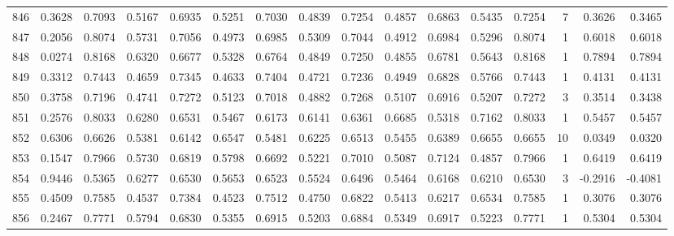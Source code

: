 \begin{tabular}{lrrrrrrrrrrrrrrr}
846 &      0.3628 &  0.7093 &  0.5167 &  0.6935 &  0.5251 &  0.7030 &  0.4839 &  0.7254 &  0.4857 &  0.6863 &   0.5435 &     0.7254 &      7 &                    0.3626 &                     0.3465 \\
847 &      0.2056 &  0.8074 &  0.5731 &  0.7056 &  0.4973 &  0.6985 &  0.5309 &  0.7044 &  0.4912 &  0.6984 &   0.5296 &     0.8074 &      1 &                    0.6018 &                     0.6018 \\
848 &      0.0274 &  0.8168 &  0.6320 &  0.6677 &  0.5328 &  0.6764 &  0.4849 &  0.7250 &  0.4855 &  0.6781 &   0.5643 &     0.8168 &      1 &                    0.7894 &                     0.7894 \\
849 &      0.3312 &  0.7443 &  0.4659 &  0.7345 &  0.4633 &  0.7404 &  0.4721 &  0.7236 &  0.4949 &  0.6828 &   0.5766 &     0.7443 &      1 &                    0.4131 &                     0.4131 \\
850 &      0.3758 &  0.7196 &  0.4741 &  0.7272 &  0.5123 &  0.7018 &  0.4882 &  0.7268 &  0.5107 &  0.6916 &   0.5207 &     0.7272 &      3 &                    0.3514 &                     0.3438 \\
851 &      0.2576 &  0.8033 &  0.6280 &  0.6531 &  0.5467 &  0.6173 &  0.6141 &  0.6361 &  0.6685 &  0.5318 &   0.7162 &     0.8033 &      1 &                    0.5457 &                     0.5457 \\
852 &      0.6306 &  0.6626 &  0.5381 &  0.6142 &  0.6547 &  0.5481 &  0.6225 &  0.6513 &  0.5455 &  0.6389 &   0.6655 &     0.6655 &     10 &                    0.0349 &                     0.0320 \\
853 &      0.1547 &  0.7966 &  0.5730 &  0.6819 &  0.5798 &  0.6692 &  0.5221 &  0.7010 &  0.5087 &  0.7124 &   0.4857 &     0.7966 &      1 &                    0.6419 &                     0.6419 \\
854 &      0.9446 &  0.5365 &  0.6277 &  0.6530 &  0.5653 &  0.6523 &  0.5524 &  0.6496 &  0.5464 &  0.6168 &   0.6210 &     0.6530 &      3 &                   -0.2916 &                    -0.4081 \\
855 &      0.4509 &  0.7585 &  0.4537 &  0.7384 &  0.4523 &  0.7512 &  0.4750 &  0.6822 &  0.5413 &  0.6217 &   0.6534 &     0.7585 &      1 &                    0.3076 &                     0.3076 \\
856 &      0.2467 &  0.7771 &  0.5794 &  0.6830 &  0.5355 &  0.6915 &  0.5203 &  0.6884 &  0.5349 &  0.6917 &   0.5223 &     0.7771 &      1 &                    0.5304 &                     0.5304 \\

\end{tabular}
